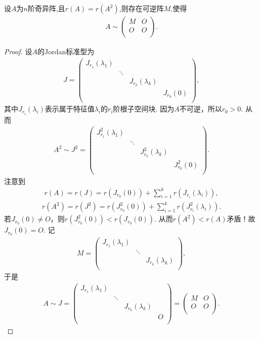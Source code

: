 \documentclass[../../main.tex]{subfiles}%
\begin{document}
\begin{proposition}\label{proposition:矩阵开方的秩等于其秩则幂零Jordan块均为1阶}
设$A$为$n$阶奇异阵,且$r(A)=r(A^2)$,则存在可逆阵$M$,使得
\begin{align*}
A\sim \left( \begin{matrix}
M&		O\\
O&		O\\
\end{matrix} \right) .
\end{align*}
\end{proposition}
\begin{proof}

设$A$的Jordan标准型为
\begin{align*}
J=\begin{pmatrix}
J_{r_1}(\lambda_1)&		&		&		\\
&		\ddots&		&		\\
&		&		J_{r_k}(\lambda_k)&		\\
&		&		&		J_{r_0}(0)\\
\end{pmatrix},
\end{align*}
其中$J_{r_i}(\lambda_i)$表示属于特征值$\lambda_i$的$r_i$阶根子空间块. 因为$A$不可逆，所以$r_0>0$. 从而
\begin{align*}
A^2\sim J^2=\begin{pmatrix}
J_{r_1}^{2}(\lambda_1)&		&		&		\\
&		\ddots&		&		\\
&		&		J_{r_k}^{2}(\lambda_k)&		\\
&		&		&		J_{r_0}^{2}(0)\\
\end{pmatrix}.
\end{align*}
注意到
\begin{align*}
r(A)=r(J)=r(J_{r_0}(0))+\sum\limits_{i=1}^k r(J_{r_i}(\lambda_i)),
\end{align*}
\begin{align*}
r(A^2)=r(J^2)=r(J_{r_0}^{2}(0))+\sum\limits_{i=1}^k r(J_{r_i}^{2}(\lambda_i)).
\end{align*}
若$J_{r_0}(0)\ne O$，则$r(J_{r_0}^{2}(0))<r(J_{r_0}(0))$. 从而$r(A^2)<r(A)$矛盾！故$J_{r_0}(0)=O$. 记
\begin{align*}
M=\begin{pmatrix}
J_{r_1}(\lambda_1)&		&		\\
&		\ddots&		\\
&		&		J_{r_k}(\lambda_k)\\
\end{pmatrix},
\end{align*}
于是
\begin{align*}
A\sim J=\begin{pmatrix}
J_{r_1}(\lambda_1)&		&		&		\\
&		\ddots&		&		\\
&		&		J_{r_k}(\lambda_k)&		\\
&		&		&		O\\
\end{pmatrix}=\begin{pmatrix}
M&		O\\
O&		O\\
\end{pmatrix}.
\end{align*}


\end{proof}
\end{document}
